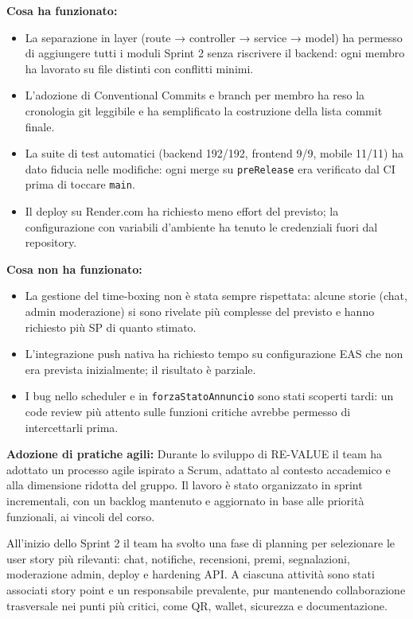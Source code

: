 \documentclass[11pt,a4paper]{article}
\newcommand{\code}[1]{\texttt{#1}}
\begin{document}
\medskip
\noindent\textbf{Cosa ha funzionato:}
\begin{itemize}[noitemsep]
  \item La separazione in layer (route → controller → service → model) ha permesso di aggiungere tutti i moduli Sprint 2 senza riscrivere il backend: ogni membro ha lavorato su file distinti con conflitti minimi.
  \item L'adozione di Conventional Commits e branch per membro ha reso la cronologia git leggibile e ha semplificato la costruzione della lista commit finale.
  \item La suite di test automatici (backend 192/192, frontend 9/9, mobile 11/11) ha dato fiducia nelle modifiche: ogni merge su \code{preRelease} era verificato dal CI prima di toccare \code{main}.
  \item Il deploy su Render.com ha richiesto meno effort del previsto; la configurazione con variabili d'ambiente ha tenuto le credenziali fuori dal repository.
\end{itemize}

\medskip
\noindent\textbf{Cosa non ha funzionato:}
\begin{itemize}[noitemsep]
  \item La gestione del time-boxing non è stata sempre rispettata: alcune storie (chat, admin moderazione) si sono rivelate più complesse del previsto e hanno richiesto più SP di quanto stimato.
  \item L'integrazione push nativa ha richiesto tempo su configurazione EAS che non era prevista inizialmente; il risultato è parziale.
  \item I bug nello scheduler e in \code{forzaStatoAnnuncio} sono stati scoperti tardi: un code review più attento sulle funzioni critiche avrebbe permesso di intercettarli prima.
\end{itemize}

\medskip
\noindent\textbf{Adozione di pratiche agili:}
  Durante lo sviluppo di RE-VALUE il team ha adottato un processo agile ispirato a Scrum, adattato al contesto accademico e alla dimensione ridotta del gruppo. Il lavoro è stato organizzato in sprint
  incrementali, con un backlog mantenuto e aggiornato in base alle priorità funzionali, ai vincoli del corso.

  All'inizio dello Sprint 2 il team ha svolto una fase di planning per selezionare le user story più rilevanti: chat, notifiche, recensioni, premi, segnalazioni, moderazione admin, deploy e hardening API. A
  ciascuna attività sono stati associati story point e un responsabile prevalente, pur mantenendo collaborazione trasversale nei punti più critici, come QR, wallet, sicurezza e documentazione.
\end{document}
